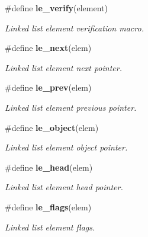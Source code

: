 \begin{CompactItemize}
\#define {\bf le\_\-verify}(element)
\begin{CompactList}\small\item\em Linked list element verification macro.\item\end{CompactList}\item 
\#define {\bf le\_\-next}(elem)
\begin{CompactList}\small\item\em Linked list element next pointer.\item\end{CompactList}\item 
\#define {\bf le\_\-prev}(elem)
\begin{CompactList}\small\item\em Linked list element previous pointer.\item\end{CompactList}\item 
\#define {\bf le\_\-object}(elem)
\begin{CompactList}\small\item\em Linked list element object pointer.\item\end{CompactList}\item 
\#define {\bf le\_\-head}(elem)
\begin{CompactList}\small\item\em Linked list element head pointer.\item\end{CompactList}\item 
\#define {\bf le\_\-flags}(elem)
\begin{CompactList}\small\item\em Linked list element flags.\item\end{CompactList}\end{CompactItemize}
